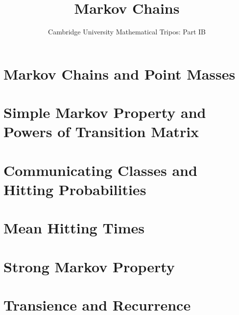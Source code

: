 \documentclass{article}
\title{Markov Chains}
\author{Cambridge University Mathematical Tripos: Part IB}
\begin{document}
\maketitle

\tableofcontentsnewpage{}

\section{Markov Chains and Point Masses}

\section{Simple Markov Property and Powers of Transition Matrix}

\section{Communicating Classes and Hitting Probabilities}

\section{Mean Hitting Times}

\section{Strong Markov Property}

\section{Transience and Recurrence}

\end{document}
